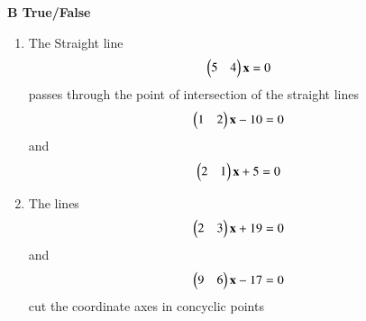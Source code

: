{\large \textbf{B True/False}}
\begin{enumerate}[label=\arabic*]
    \item The Straight line \begin{align} 
    \begin{pmatrix}5 & 4\end{pmatrix}\mathbf{x} &= 0
    \end{align} passes through the point of intersection of the straight lines \begin{align} 
    \begin{pmatrix}1 & 2\end{pmatrix}\mathbf{x} - 10 &= 0
    \end{align} and \begin{align} 
    \begin{pmatrix}2 & 1\end{pmatrix}\mathbf{x} + 5 &= 0
    \end{align}
    \item The lines \begin{align} 
    \begin{pmatrix}2 & 3\end{pmatrix}\mathbf{x} + 19 &= 0
    \end{align} and \begin{align} 
    \begin{pmatrix}9 & 6\end{pmatrix}\mathbf{x} - 17 &= 0
    \end{align} cut the coordinate axes in concyclic points
\end{enumerate}

